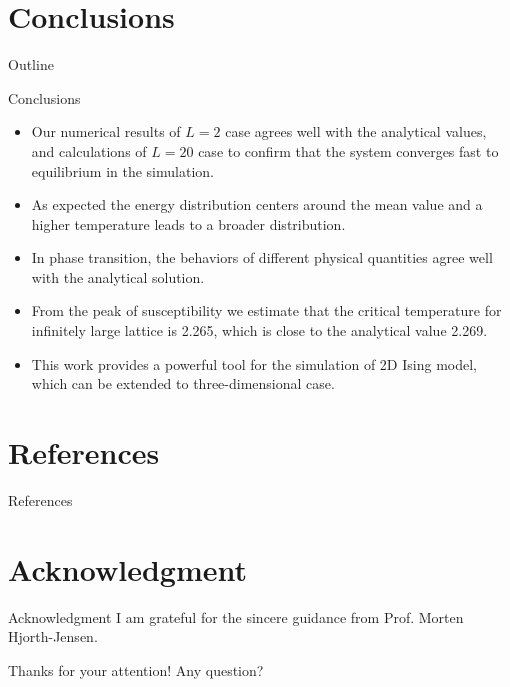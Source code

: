 \documentclass{beamer}
\begin{document}
\section{Conclusions}
\begin{frame}{Outline}
\tableofcontents[currentsection]
\end{frame}

\begin{frame}{Conclusions}
\begin{itemize}
	\item<1-> Our numerical results of $L=2$ case agrees well with the analytical values, 
	and calculations of $L=20$ case to confirm that the system converges fast to equilibrium in the simulation. 
	\item<2-> As expected the energy distribution centers around the mean value and a higher temperature leads to a broader distribution. 
	\item<3-> In phase transition, the behaviors of different physical quantities agree well with the analytical solution. 
	\item<4-> From the peak of susceptibility we estimate that the critical temperature for infinitely large lattice is 2.265, 
	which is close to the analytical value 2.269. 
	\item<5-> This work provides a powerful tool for the simulation of 2D Ising model, which can be extended to three-dimensional case. 
\end{itemize}
\end{frame}

\section*{References}
\begin{frame}{References}
\nocite{*} 
\scriptsize


\end{frame}

\section*{Acknowledgment}
\begin{frame}{Acknowledgment}
	I am grateful for the sincere guidance from Prof. Morten Hjorth-Jensen. 
	\par
	Thanks for your attention! Any question? 
\end{frame}
\end{document}
